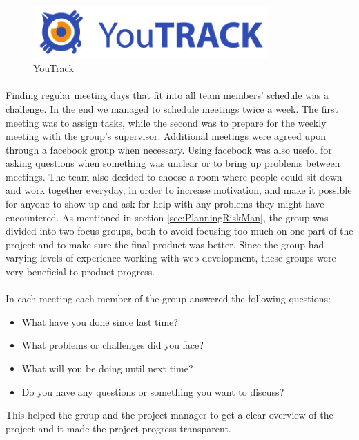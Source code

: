 \begin{figure}[ht!]
\centering
\includegraphics[width=90mm]{./Planning/img/YouTrack_logo}
\caption{YouTrack \label{fig:PlanningQualityRoutinesYouTrack}}
\end{figure}

\paragraph{} Finding regular meeting days that fit into all team members' schedule was a challenge. In the end we managed to schedule meetings twice a week. The first meeting was to assign tasks, while the second was to prepare for the weekly meeting with the group's supervisor. Additional meetings were agreed upon through a facebook group when necessary. Using facebook was also usefol for asking questions when something was unclear or to bring up problems between meetings. The team also decided to choose a room where people could sit down and work together everyday, in order to increase motivation, and make it possible for anyone to show up and ask for help with any problems they might have encountered. As mentioned in section \ref{sec:PlanningRiskMan}, the group was divided into two focus groups, both to avoid focusing too much on one part of the project and to make sure the final product was better. Since the group had varying levels of experience working with web development, these groups were very beneficial to product progress.

\paragraph{} In each meeting each member of the group answered the following questions:
\begin{itemize}
  \item What have you done since last time?
  \item What problems or challenges did you face?
  \item What will you be doing until next time?
  \item Do you have any questions or something you want to discuss?
\end{itemize}
This helped the group and the project manager to get a clear overview of the project and it made the project progress transparent.


